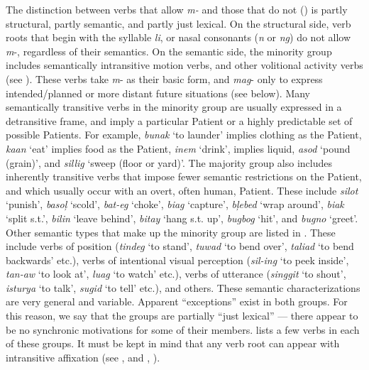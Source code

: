 The distinction between verbs that allow \textit{m-} and those that do not () is partly structural, partly semantic, and partly just lexical. On the structural side, verb roots that begin with the syllable \textit{li}, or nasal consonants (\textit{n} or \textit{ng}) do not allow \textit{m}{}-, regardless of their semantics. On the semantic side, the minority group includes semantically intransitive motion verbs, and other volitional activity verbs (see \citealt{pebley1998}). These verbs take \textit{m}{}- as their basic form, and \textit{mag}{}- only to express intended/planned or more distant future situations (see below). Many semantically transitive verbs in the minority group are usually expressed in a detransitive frame, and imply a particular Patient or a highly predictable set of possible Patients. For example, \textit{bunak} ‘to launder’ implies clothing as the Patient, \textit{kaan} ‘eat’ implies food as the Patient, \textit{inem} ‘drink’, implies liquid, \textit{asod} ‘pound (grain)’, and \textit{sillig} ‘sweep (floor or yard)’. The majority group also includes inherently transitive verbs that impose fewer semantic restrictions on the Patient, and which usually occur with an overt, often human, Patient. These include \textit{silot} ‘punish’, \textit{basoļ} ‘scold’, \textit{bat-eg} ‘choke’, \textit{biag} ‘capture’, \textit{bļebed} ‘wrap around’, \textit{biak} ‘split s.t.’, \textit{bilin} ‘leave behind’, \textit{bitay} ‘hang s.t. up’, \textit{bugbog} ‘hit’, and \textit{bugno} ‘greet’. Other semantic types that make up the minority group are listed in . These include verbs of position (\textit{tindeg} ‘to stand’, \textit{tuwad} ‘to bend over’, \textit{taliad} ‘to bend backwards’ etc.), verbs of intentional visual perception (\textit{sil-ing} ‘to peek inside’, \textit{tan\nobreakdash-aw} ‘to look at’, \textit{luag} ‘to watch’ etc.), verbs of utterance (\textit{singgit} ‘to shout’, \textit{isturya} ‘to talk’, \textit{sugid} ‘to tell’ etc.), and others. These semantic characterizations are very general and variable. Apparent “exceptions” exist in both groups. For this reason, we say that the groups are partially “just lexical” — there appear to be no synchronic motivations for some of their members.  lists a few verbs in each of these groups. It must be kept in mind that any verb root can appear with intransitive affixation (see , and , ).

